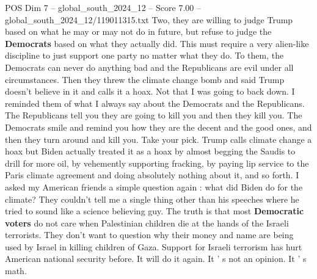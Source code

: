 \begin{textsample}{POS Dim 7 – global\_south\_2024\_12 – Score 7.00 – global\_south\_2024\_12/119011315.txt}
Two, they are willing to judge Trump based on what he may or may not do in future, but refuse to judge the \textbf{Democrats} based on what they actually did.
This must require a very alien-like discipline to just support one party no matter what they do.
To them, the Democrats can never do anything bad and the Republicans are evil under all circumstances.
Then they threw the climate change bomb and said Trump doesn't believe in it and calls it a hoax.
Not that I was going to back down.
I reminded them of what I always say about the Democrats and the Republicans.
The Republicans tell you they are going to kill you and then they kill you.
The Democrats smile and remind you how they are the decent and the good ones, and then they turn around and kill you.
Take your pick.
Trump calls climate change a hoax but Biden actually treated it as a hoax by almost begging the Saudis to drill for more oil, by vehemently supporting fracking, by paying lip service to the Paris climate agreement and doing absolutely nothing about it, and so forth.
I asked my American friends a simple question again : what did Biden do for the climate?
They couldn't tell me a single thing other than his speeches where he tried to sound like a science believing guy.
The truth is that most \textbf{Democratic} \textbf{voters} do not care when Palestinian children die at the hands of the Israeli terrorists.
They don't want to question why their money and name are being used by Israel in killing children of Gaza.
Support for Israeli terrorism has hurt American national security before.
It will do it again.
It ' s not an opinion.
It ' s math.

\end{textsample}

